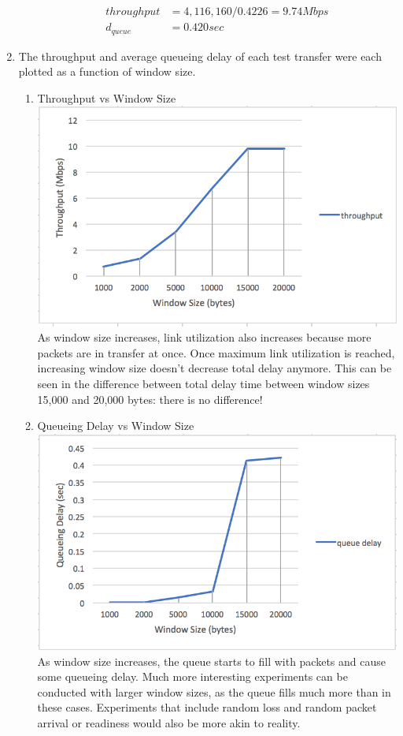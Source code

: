 \documentclass[fleqn,11pt]{article}
\begin{document}
\begin{enumerate}
\begin{enumerate}
\begin{align*}
throughput &= 4,116,160 / 0.4226 = 9.74Mbps \\
d_{queue} &= 0.420 sec
\end{align*}

\end{enumerate}

\item The throughput and average queueing delay of each test transfer were each plotted as a function of window size.

\begin{enumerate}
\item Throughput vs Window Size \\
\includegraphics{throughputGraph.png} \\
As window size increases, link utilization also increases because more packets are in transfer at once. Once maximum link utilization is reached, increasing window size doesn't decrease total delay anymore. This can be seen in the difference between total delay time between window sizes 15,000 and 20,000 bytes: there is no difference!

\item Queueing Delay vs Window Size \\
\includegraphics{delayGraph.png} \\
As window size increases, the queue starts to fill with packets and cause some queueing delay. Much more interesting experiments can be conducted with larger window sizes, as the queue fills much more than in these cases. Experiments that include random loss and random packet arrival or readiness would also be more akin to reality.


\end{enumerate}
\end{enumerate}
\end{document}
